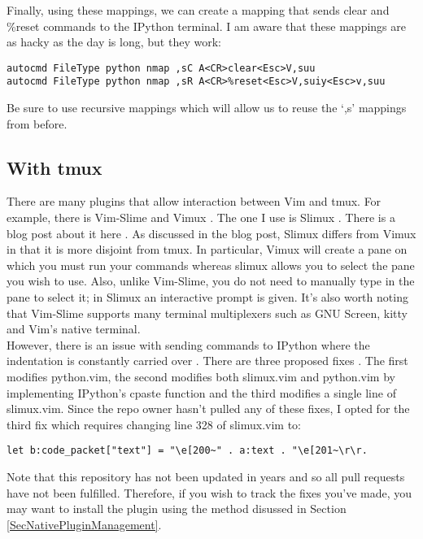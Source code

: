 \documentclass[10pt]{article}
\begin{document}
Finally, using these mappings, we can create a mapping that sends clear and \%reset commands to the IPython terminal. I
am aware that these mappings are as hacky as the day is long, but they work:
\begin{lstlisting}
autocmd FileType python nmap ,sC A<CR>clear<Esc>V,suu
autocmd FileType python nmap ,sR A<CR>%reset<Esc>V,suiy<Esc>v,suu
\end{lstlisting}
Be sure to use recursive mappings which will allow us to reuse the `,s' mappings from before.

\subsection{With tmux}
There are many plugins that allow interaction between Vim and tmux. For example, there is Vim-Slime
\cite{jpalardy2012slime} and Vimux \cite{benmills2009vimux}. The one I use is Slimux \cite{esamattis2015slimux}. There
is a blog post about it here \cite{suuronen2012slimux}. As discussed in the blog post, Slimux differs from Vimux in
that it is more disjoint from tmux. In particular, Vimux will create a pane on which you must run your commands whereas
slimux allows you to select the pane you wish to use. Also, unlike Vim-Slime, you do not need to manually type in the
pane to select it; in Slimux an interactive prompt is given. It's also worth noting that Vim-Slime supports many
terminal multiplexers such as GNU Screen, kitty and Vim's native terminal.\\

However, there is an issue with sending commands to IPython where the indentation is constantly carried over
\cite{kmARC2015indentationerror}. There are three proposed fixes
\cite{lotabout2017remove,karadaharu2016add,zcesur2018fix}. The first modifies python.vim, the second modifies both
slimux.vim and python.vim by implementing IPython's cpaste function and the third modifies a single line of slimux.vim.
Since the repo owner hasn't pulled any of these fixes, I opted for the third fix which requires changing line 328 of
slimux.vim to:
\begin{lstlisting}
let b:code_packet["text"] = "\e[200~" . a:text . "\e[201~\r\r.
\end{lstlisting}
Note that this repository has not been updated in years and so all pull requests have not been fulfilled. Therefore, if
you wish to track the fixes you've made, you may want to install the plugin using the method disussed in Section
\ref{SecNativePluginManagement}.\\
\end{document}
